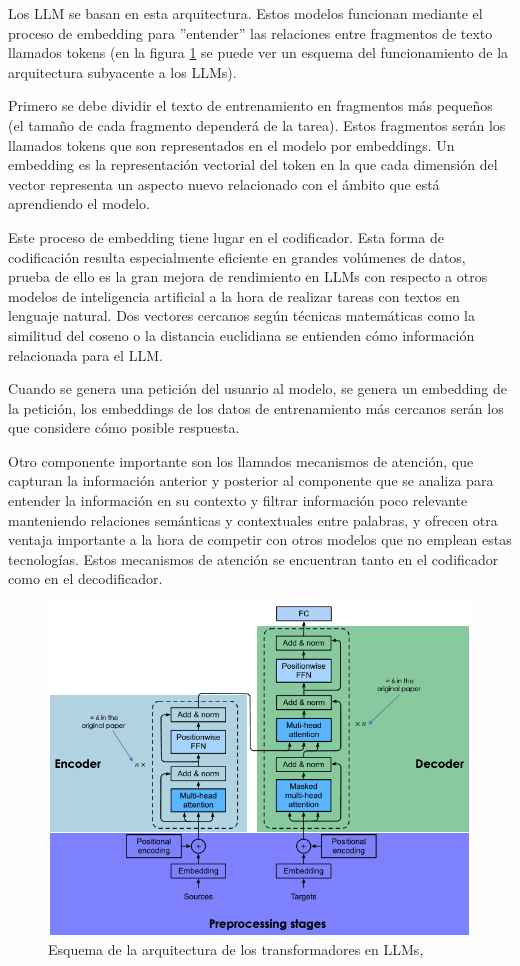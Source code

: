 Los LLM se basan en esta arquitectura. Estos modelos funcionan mediante el proceso de embedding para ''entender'' las relaciones entre fragmentos de texto llamados tokens (en la figura \ref{fig:llmarch} se puede ver un esquema del funcionamiento de la arquitectura subyacente a los LLMs).

Primero se debe dividir el texto de entrenamiento en fragmentos más pequeños (el tamaño de cada fragmento dependerá de la tarea). Estos fragmentos serán los llamados tokens que son representados en el modelo por embeddings. Un embedding es la representación vectorial del token en la que cada dimensión del vector representa un aspecto nuevo relacionado con el ámbito que está aprendiendo el modelo.

Este proceso de embedding tiene lugar en el codificador. Esta forma de codificación resulta especialmente eficiente en grandes volúmenes de datos, prueba de ello es la gran mejora de rendimiento en LLMs con respecto a otros modelos de inteligencia artificial a la hora de realizar tareas con textos en lenguaje natural. Dos vectores cercanos según técnicas matemáticas como la similitud del coseno o la distancia euclidiana se entienden cómo información relacionada para el LLM.

Cuando se genera una petición del usuario al modelo, se genera un embedding de la petición, los embeddings de los datos de entrenamiento más cercanos serán los que considere cómo posible respuesta.

Otro componente importante son los llamados mecanismos de atención, que capturan la información anterior y posterior al componente que se analiza para entender la información en su contexto y filtrar información poco relevante  manteniendo relaciones semánticas y contextuales entre palabras, y ofrecen otra ventaja importante a la hora de competir con otros modelos que no emplean estas tecnologías. Estos mecanismos de atención se encuentran tanto en el codificador como en el decodificador.

\begin{figure}[h]
    \centering
    \includegraphics[width=1\textwidth]{img/llmarch.png}
    \caption{Esquema de la arquitectura de los transformadores en LLMs, \cite{javier_canales_luna_what_2023}}
    \label{fig:llmarch}
\end{figure}

